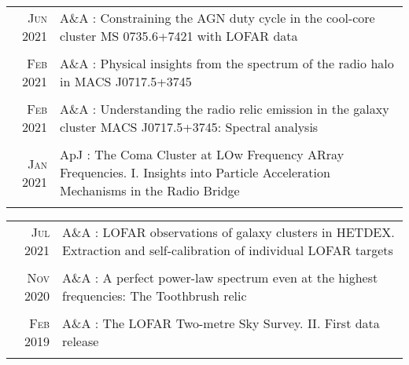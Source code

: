 \documentclass[11pt,a4paper,notitlepage]{article}
\begin{document}
\begin{tabular}{r|p{12.5cm}}
	\textsc{Jun 2021} & A\&A : Constraining the AGN duty cycle in the cool-core cluster MS 0735.6+7421 with LOFAR data
	 \citep{2021AA...650A.170B} \\
	\multicolumn{2}{c}{} \\


	\textsc{Feb 2021} & A\&A : Physical insights from the spectrum of the radio halo in MACS J0717.5+3745 \citep{2021AA...646A.135R} \\
	\multicolumn{2}{c}{} \\
	
	\textsc{Feb 2021} & A\&A : Understanding the radio relic emission in the galaxy cluster MACS J0717.5+3745: Spectral analysis \citep{2021AA...646A..56R} \\
	\multicolumn{2}{c}{} \\
	
	\textsc{Jan 2021} & ApJ : The Coma Cluster at LOw Frequency ARray Frequencies. I. Insights into Particle Acceleration Mechanisms in the Radio Bridge \citep{2021ApJ...907...32B} \\
	\multicolumn{2}{c}{} \\

\end{tabular}

\begin{tabular}{r|p{12.5cm}}

	
	\textsc{Jul 2021} & A\&A : LOFAR observations of galaxy clusters in HETDEX. Extraction and self-calibration of individual LOFAR targets \citep{2021AA...651A.115V} \\
	\multicolumn{2}{c}{} \\
	
	\textsc{Nov 2020} & A\&A : A perfect power-law spectrum even at the highest frequencies: The Toothbrush relic\citep{2020AA...642L..13R} \\
	\multicolumn{2}{c}{} \\
%	
	
	\textsc{Feb 2019} & A\&A : The LOFAR Two-metre Sky Survey. II. First data release \citep{2019AA...622A...1S} \\
	\multicolumn{2}{c}{} \\
	
\end{tabular}
\end{document}
